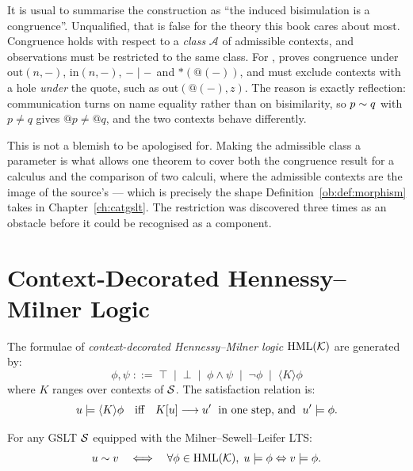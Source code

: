 \begin{remark}
\label{lts:rem:relative}
It is usual to summarise the construction as ``the induced bisimulation is a
congruence''. Unqualified, that is false for the theory this book cares about
most. Congruence holds with respect to a \emph{class} $\mathcal{A}$ of admissible
contexts, and observations must be restricted to the same class. For \rhoc,
\cite{BIHOL} proves congruence under $\mathrm{out}(n,-)$, $\mathrm{in}(n,-)$,
$-\mid-$ and $\ast(@(-))$, and must exclude contexts with a hole \emph{under} the
quote, such as $\mathrm{out}(@(-),z)$. The reason is exactly reflection:
communication turns on name equality rather than on bisimilarity, so $p \sim q$
with $p \neq q$ gives $@p \neq @q$, and the two contexts behave differently.

This is not a blemish to be apologised for. Making the admissible class a
parameter is what allows one theorem to cover both the congruence result for a
calculus and the comparison of two calculi, where the admissible contexts are the
image of the source's --- which is precisely the shape
Definition~\ref{ob:def:morphism} takes in Chapter~\ref{ch:catgslt}. The
restriction was discovered three times as an obstacle before it could be
recognised as a component.
\end{remark}

\section{Context-Decorated Hennessy--Milner Logic}

\begin{definition}
\label{def:cdHML}
The formulae of \emph{context-decorated Hennessy--Milner logic}
$\mathrm{HML}(\mathcal{K})$ are generated by:
\[
  \phi, \psi \;::=\; \top \;\mid\; \bot \;\mid\; \phi \wedge \psi \;\mid\;
  \neg\phi \;\mid\; \langle K \rangle \phi
\]
where $K$ ranges over contexts of $\mathcal{S}$.
The satisfaction relation is:
\[
  u \models \langle K \rangle \phi \quad\text{iff}\quad
  K[u] \longrightarrow u' \;\text{ in one step, and }\; u' \models \phi.
\]
\end{definition}

\begin{theorem}[Adequacy]
For any GSLT $\mathcal{S}$ equipped with the Milner--Sewell--Leifer LTS:
\[
  u \sim v \quad\Longleftrightarrow\quad
  \forall \phi \in \mathrm{HML}(\mathcal{K}),\; u \models \phi \Leftrightarrow v \models \phi.
\]
\end{theorem}

